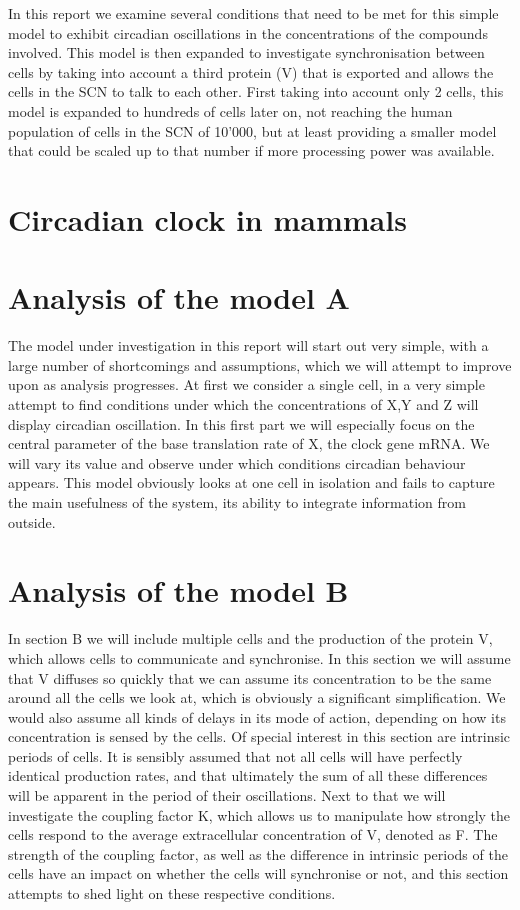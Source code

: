     In this report we examine several conditions that need to be met for this simple model to exhibit circadian oscillations in the concentrations of the compounds involved. This model is then expanded to investigate synchronisation between cells by taking into account a third protein (V) that is exported and allows the cells in the SCN to talk to each other. First taking into account only 2 cells, this model is expanded to hundreds of cells later on, not reaching the human population of cells in the SCN of 10'000, but at least providing a smaller model that could be scaled up to that number if more processing power was available. \par
    \section{Circadian clock in mammals}
    
    
    \section{Analysis of the model A}
    The model under investigation in this report will start out very simple, with a large number of shortcomings and assumptions, which we will attempt to improve upon as analysis progresses. At first we consider a single cell, in a very simple attempt to find conditions under which the concentrations of X,Y and Z will display circadian oscillation. In this first part we will especially focus on the central parameter of the base translation rate of X, the clock gene mRNA. We will vary its value and observe under which conditions circadian behaviour appears. This model obviously looks at one cell in isolation and fails to capture the main usefulness of the system, its ability to integrate information from outside. \par
    
    \section{Analysis of the model B}
    In section B we will include multiple cells and the production of the protein V, which allows cells to communicate and synchronise. In this section we will assume that V diffuses so quickly that we can assume its concentration to be the same around all the cells we look at, which is obviously a significant simplification. We would also assume all kinds of delays in its mode of action, depending on how its concentration is sensed by the cells. Of special interest in this section are intrinsic periods of cells. It is sensibly assumed that not all cells will have perfectly identical production rates, and that ultimately the sum of all these differences will be apparent in the period of their oscillations. Next to that we will investigate the coupling factor K, which allows us to manipulate how strongly the cells respond to the average extracellular concentration of V, denoted as F. The strength of the coupling factor, as well as the difference in intrinsic periods of the cells have an impact on whether the cells will synchronise or not, and this section attempts to shed light on these respective conditions.  \par
    

